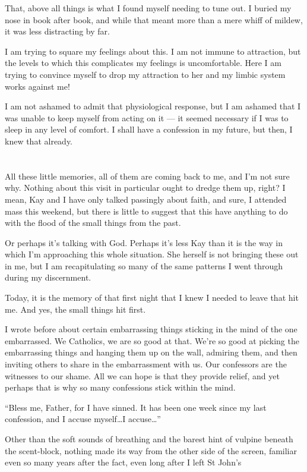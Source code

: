 That, above all things is what I found myself needing to tune out. I buried my nose in book after book, and while that meant more than a mere whiff of mildew, it was less distracting by far.

I am trying to square my feelings about this. I am not immune to attraction, but the levels to which this complicates my feelings is uncomfortable. Here I am trying to convince myself to drop my attraction to her and my limbic system works against me!

I am not ashamed to admit that physiological response, but I am ashamed that I was unable to keep myself from acting on it --- it seemed necessary if I was to sleep in any level of comfort. I shall have a confession in my future, but then, I knew that already.

\section{}

All these little memories, all of them are coming back to me, and I'm not sure why. Nothing about this visit in particular ought to dredge them up, right? I mean, Kay and I have only talked passingly about faith, and sure, I attended mass this weekend, but there is little to suggest that this have anything to do with the flood of the small things from the past.

Or perhaps it's talking with God. Perhaps it's less Kay than it is the way in which I'm approaching this whole situation. She herself is not bringing these out in me, but I am recapitulating so many of the same patterns I went through during my discernment.

Today, it is the memory of that first night that I knew I needed to leave that hit me. And yes, the small things hit first.

I wrote before about certain embarrassing things sticking in the mind of the one embarrassed. We Catholics, we are so good at that. We're so good at picking the embarrassing things and hanging them up on the wall, admiring them, and then inviting others to share in the embarrassment with us. Our confessors are the witnesses to our shame. All we can hope is that they provide relief, and yet perhaps that is why so many confessions stick within the mind.

``Bless me, Father, for I have sinned. It has been one week since my last confession, and I accuse myself\ldots I accuse\ldots{}''

Other than the soft sounds of breathing and the barest hint of vulpine beneath the scent-block, nothing made its way from the other side of the screen, familiar even so many years after the fact, even long after I left St John's

